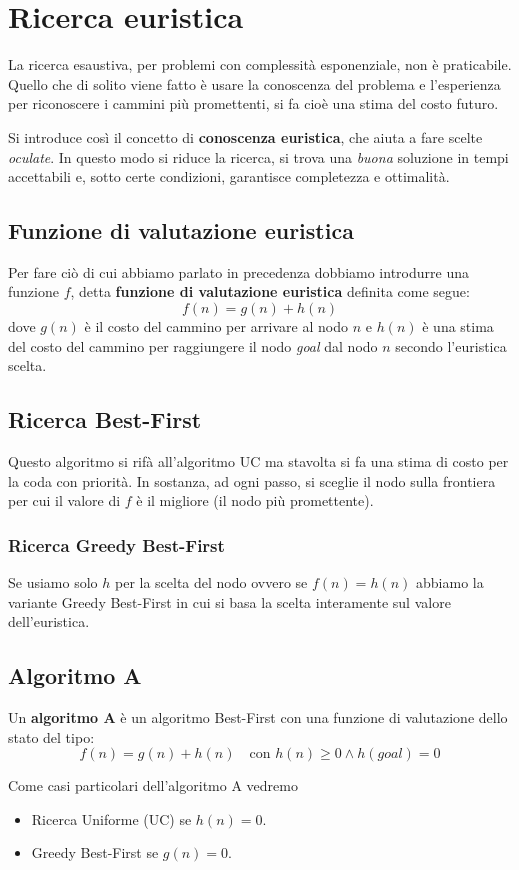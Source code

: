 \chapter{Ricerca euristica}
La ricerca esaustiva, per problemi con complessit\`a esponenziale, non \`e praticabile.
Quello che di solito viene fatto \`e usare la conoscenza del problema e l'esperienza
per riconoscere i cammini pi\`u promettenti, si fa cio\`e una stima del costo futuro.

Si introduce cos\`i il concetto di \textbf{conoscenza euristica}, che aiuta a fare scelte
\emph{oculate}. In questo modo si riduce la ricerca, si trova una \emph{buona} soluzione
in tempi accettabili e, sotto certe condizioni, garantisce completezza e ottimalit\`a.

\section{Funzione di valutazione euristica}
Per fare ci\`o di cui abbiamo parlato in precedenza dobbiamo introdurre una funzione
$f$, detta \textbf{funzione di valutazione euristica} definita come segue:
\[ f(n) = g(n) + h(n) \]
dove $g(n)$ \`e il costo del cammino per arrivare al nodo $n$ e $h(n)$ \`e una stima
del costo del cammino per raggiungere il nodo \emph{goal} dal nodo $n$ secondo l'euristica
scelta.

\section{Ricerca Best-First}
Questo algoritmo si rif\`a all'algoritmo UC ma stavolta si fa una stima di costo per
la coda con priorit\`a. In sostanza, ad ogni passo, si sceglie il nodo sulla frontiera
per cui il valore di $f$ \`e il migliore (il nodo pi\`u promettente).

\subsection{Ricerca Greedy Best-First}
Se usiamo solo $h$ per la scelta del nodo ovvero se $f(n) = h(n)$ abbiamo la variante
Greedy Best-First in cui si basa la scelta interamente sul valore dell'euristica.

\section{Algoritmo A}
\begin{definition}
	Un \textbf{algoritmo A} \`e un algoritmo Best-First con una funzione di valutazione
	dello stato del tipo:
	\[ f(n) = g(n) + h(n) \quad \text{con } h(n) \geq 0 \wedge h(goal) = 0 \]
\end{definition}
Come casi particolari dell'algoritmo A vedremo
\begin{itemize}
	\item Ricerca Uniforme (UC) se $h(n) = 0$.
	\item Greedy Best-First se $g(n) = 0$.
\end{itemize}

